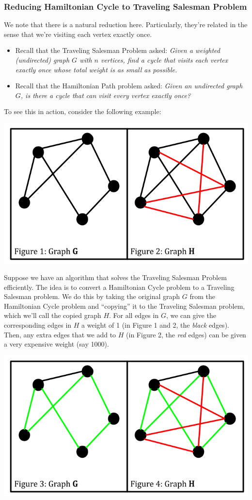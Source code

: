 \documentclass[letterpaper]{article}
\begin{document}
\subsubsection{Reducing Hamiltonian Cycle to Traveling Salesman Problem}
We note that there is a natural reduction here. Particularly, they're related in the sense that we're visiting each vertex exactly once. 
\begin{itemize}
    \item Recall that the Traveling Salesman Problem asked: \emph{Given a weighted (undirected) graph $G$ with $n$ vertices, find a cycle that visits each vertex exactly once whose total weight is as small as possible.}
    \item Recall that the Hamiltonian Path problem asked: \emph{Given an undirected graph $G$, is there a cycle that can visit every vertex exactly once?}
\end{itemize}
To see this in action, consider the following example: 
\begin{center}
    \includegraphics[scale=0.4]{assets/ham_tsp.png}
\end{center}
Suppose we have an algorithm that solves the Traveling Salesman Problem efficiently. The idea is to convert a Hamiltonian Cycle problem to a Traveling Salesman problem. We do this by taking the original graph $G$ from the Hamiltonian Cycle problem and ``copying'' it to the Traveling Salesman problem, which we'll call the copied graph $H$. For all edges in $G$, we can give the corresponding edges in $H$ a weight of 1 (in Figure 1 and 2, the \emph{black} edges). Then, any extra edges that we add to $H$ (in Figure 2, the \emph{red} edges) can be given a very expensive weight (say 1000). 
\begin{center}
    \includegraphics[scale=0.4]{assets/ham_tsp_2.png}
\end{center}
\end{document}
